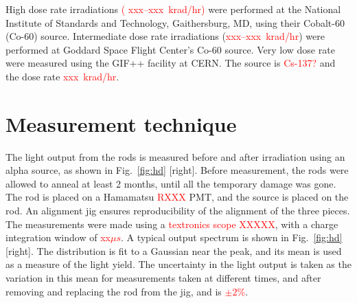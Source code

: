 \documentclass[review]{elsarticle}
\begin{document}
High dose rate irradiations \textcolor{red}{( xxx--xxx~krad/hr)}
were performed at the National Institute of Standards and Technology, Gaithersburg, MD, using their Cobalt-60 (Co-60) source.  Intermediate dose rate irradiations (\textcolor{red}{xxx--xxx~krad/hr}) were performed at Goddard Space Flight Center's Co-60 source.  Very low dose rate were measured using the GIF++ facility\cite{gif} at CERN.  The source is \textcolor{red}{Cs-137?} and the dose rate \textcolor{red}{xxx~krad/hr}.

\section{Measurement technique}
The light output from the rods is measured before and after
irradiation using an alpha source, as shown in Fig.~\ref{fig:hd} [right].
Before measurement, the rods were allowed to anneal
at least 2 months,  until all the temporary damage was gone.
The rod is placed on a Hamamatsu \textcolor{red}{RXXX} PMT, and the
source is placed on the rod.  An alignment jig ensures reproducibility
of the alignment of the three pieces.  The measurements were made using
a \textcolor{red}{textronics scope XXXXX}, with a charge integration
window of \textcolor{red}{xx$\mu s$}.
A typical output spectrum is shown in Fig.~\ref{fig:hd} [right].
The distribution is fit to a Gaussian near the peak, and its mean is used as a measure of the light yield.  The uncertainty in the light output is taken as the variation in this mean for measurements taken at different times, and after removing and replacing the rod from the jig, and is
\textcolor{red}{$\pm 2$\%}.
\end{document}

